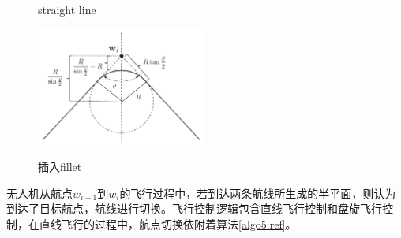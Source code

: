 \documentclass[UTF8,a4paper,10pt,nocolorlinks]{ctexart}
\begin{document}
    \begin{figure}[b]
        \centering
        \caption{straight line}
    \end{figure}
    \begin{figure}[h]
        \centering
        \includegraphics[width=0.5\textwidth]{picture/algo6_2.png}
        \label{figure:alg6}
        \caption{插入fillet}
    \end{figure}
    \par 无人机从航点$w_{i-1}$到$w_{i}$的飞行过程中，若到达两条航线所生成的半平面，则认为到达了目标航点，航线进行切换。飞行控制逻辑包含直线飞行控制和盘旋飞行控制，在直线飞行的过程中，航点切换依附着算法\ref{algo5:ref}。
    
\end{document}
